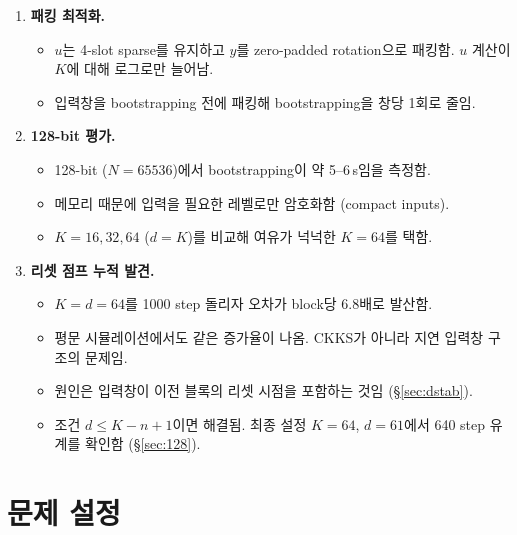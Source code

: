 \documentclass[11pt,a4paper]{article}
\begin{document}
\begin{enumerate}
\begin{itemize}
  \item 스칼라 방식은 $K$에 비례해 곱셈이 늘어 $u$ 계산이 병목이 됨.
  \end{itemize}
\item \textbf{패킹 최적화.}
  \begin{itemize}
  \item $u$는 4-slot sparse를 유지하고 $y$를 zero-padded rotation으로 패킹함. $u$ 계산이 $K$에 대해 로그로만 늘어남.
  \item 입력창을 bootstrapping 전에 패킹해 bootstrapping을 창당 1회로 줄임.
  \end{itemize}
\item \textbf{128-bit 평가.}
  \begin{itemize}
  \item 128-bit ($N=65536$)에서 bootstrapping이 약 5--6\,s임을 측정함.
  \item 메모리 때문에 입력을 필요한 레벨로만 암호화함 (compact inputs).
  \item $K=16,32,64$ ($d=K$)를 비교해 여유가 넉넉한 $K=64$를 택함.
  \end{itemize}
\item \textbf{리셋 점프 누적 발견.}
  \begin{itemize}
  \item $K=d=64$를 1000 step 돌리자 오차가 block당 6.8배로 발산함.
  \item 평문 시뮬레이션에서도 같은 증가율이 나옴. CKKS가 아니라 지연 입력창 구조의 문제임.
  \item 원인은 입력창이 이전 블록의 리셋 시점을 포함하는 것임 (\S\ref{sec:dstab}).
  \item 조건 $d\le K-n+1$이면 해결됨. 최종 설정 $K=64$, $d=61$에서 640 step 유계를 확인함 (\S\ref{sec:128}).
  \end{itemize}
\end{enumerate}

\section{문제 설정}
\end{document}
